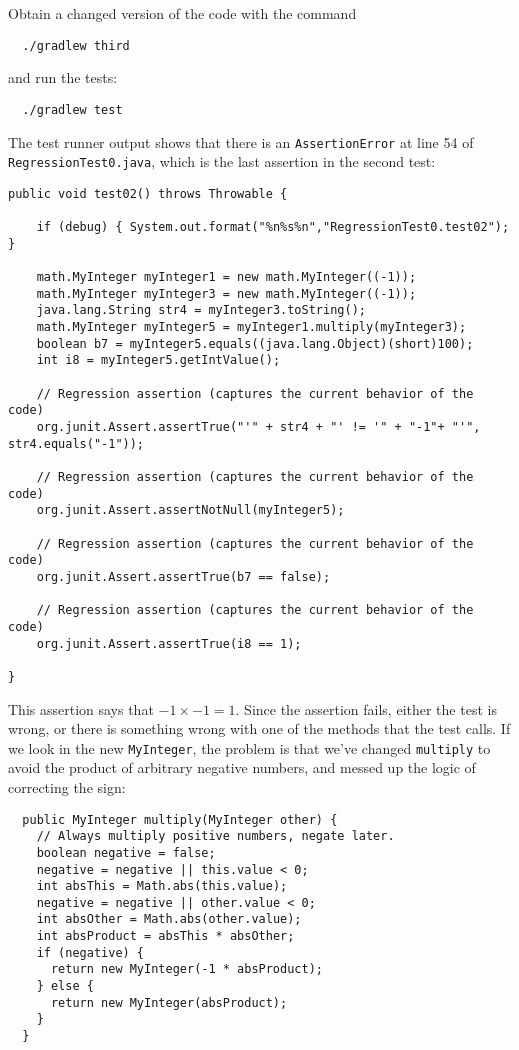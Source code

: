 \documentclass[11pt, oneside]{article} %
\newcommand{\code}[1]{{\texttt{#1}}}
\begin{document}
Obtain a changed version of the code with the command
\begin{verbatim}
  ./gradlew third 
\end{verbatim}
and run the tests:
\begin{verbatim}
  ./gradlew test 
\end{verbatim}
The test runner output shows that there is an \code{AssertionError} at line 54 of \code{RegressionTest0.java}, which is the last assertion in the second test:
\begin{verbatim}
public void test02() throws Throwable {

    if (debug) { System.out.format("%n%s%n","RegressionTest0.test02"); }

    math.MyInteger myInteger1 = new math.MyInteger((-1));
    math.MyInteger myInteger3 = new math.MyInteger((-1));
    java.lang.String str4 = myInteger3.toString();
    math.MyInteger myInteger5 = myInteger1.multiply(myInteger3);
    boolean b7 = myInteger5.equals((java.lang.Object)(short)100);
    int i8 = myInteger5.getIntValue();
    
    // Regression assertion (captures the current behavior of the code)
    org.junit.Assert.assertTrue("'" + str4 + "' != '" + "-1"+ "'", str4.equals("-1"));
    
    // Regression assertion (captures the current behavior of the code)
    org.junit.Assert.assertNotNull(myInteger5);
    
    // Regression assertion (captures the current behavior of the code)
    org.junit.Assert.assertTrue(b7 == false);
    
    // Regression assertion (captures the current behavior of the code)
    org.junit.Assert.assertTrue(i8 == 1);

}
\end{verbatim}
This assertion says that $-1 \times -1 = 1$.
Since the assertion fails, either the test is wrong, or there is something
wrong with one of the methods that the test calls.
If we look in the new \code{MyInteger}, the problem is that we've changed \code{multiply} to avoid the product of arbitrary negative numbers, and messed up the logic of correcting the sign:
\begin{verbatim}
  public MyInteger multiply(MyInteger other) {
    // Always multiply positive numbers, negate later.
    boolean negative = false;
    negative = negative || this.value < 0;
    int absThis = Math.abs(this.value);
    negative = negative || other.value < 0;
    int absOther = Math.abs(other.value);
    int absProduct = absThis * absOther;
    if (negative) {
      return new MyInteger(-1 * absProduct);
    } else {
      return new MyInteger(absProduct);
    }
  }
\end{verbatim}
\end{document}
